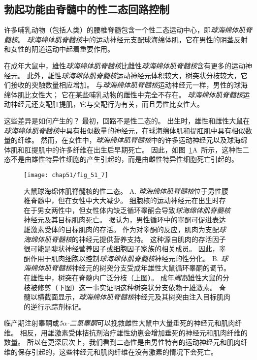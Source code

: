 \subsection{勃起功能由脊髓中的性二态回路控制}

许多哺乳动物（包括人类）的腰椎脊髓包含一个性二态运动中心，即\textit{球海绵体肌脊髓核}。
\textit{球海绵体肌脊髓核}中的运动神经元支配球海绵体肌，它在男性的阴茎反射和女性的阴道运动中起着重要作用。


在成年大鼠中，雄性\textit{球海绵体肌脊髓核}比雌性\textit{球海绵体肌脊髓核}含有更多的运动神经元。
此外，雄性\textit{球海绵体肌脊髓核}运动神经元体积较大，树突状分枝较大，它们接收的突触数量相应增加。
与\textit{球海绵体肌脊髓核}运动神经元一样，男性的球海绵体肌比女性大；
它在某些哺乳动物的雌性中完全不存在。
\textit{球海绵体肌脊髓核}运动神经元还支配肛提肌，它与交配行为有关，而且男性比女性大。


这些差异是如何产生的？
最初，回路不是性二态的。
出生时，雄性和雌性大鼠在\textit{球海绵体肌脊髓核}中具有相似数量的神经元，在球海绵体肌和提肛肌中具有相似数量的纤维。
然而，在女性中，\textit{球海绵体肌脊髓核}中的许多运动神经元以及球海绵体肌和肛提肌中的许多纤维在出生后早期死亡。
因此，如图~\ref{fig:51_7}A~所示，这种性二态不是由雄性特异性细胞的产生引起的，而是由雌性特异性细胞死亡引起的。


\begin{figure}[htbp]
	\centering
	\texttt{[image: chap51/fig\_51\_7]}
	\caption{大鼠球海绵体肌脊髓核的性二态。
		A. \textit{球海绵体肌脊髓核}位于男性腰椎脊髓中，但在女性中大大减少。
		细胞核的运动神经元在出生时存在于男女两性中，但女性体内缺乏循环睾酮会导致\textit{球海绵体肌脊髓核}神经元及其目标肌肉死亡。
		据认为，男性循环中的睾酮可促进表达雄激素受体的目标肌肉的存活。
		作为对睾酮的反应，肌肉为支配\textit{球海绵体肌脊髓核}的神经元提供营养支持。
		这种源自肌肉的存活因子很可能是睫状神经营养因子或细胞因子家族的相关成员。
		因此，睾酮作用于肌肉细胞以控制\textit{球海绵体肌脊髓核}神经元的性分化\cite{morris2004sexual}。
		B. \textit{球海绵体肌脊髓核}神经元的树突分支受成年雄性大鼠循环睾酮的调节。
		在雄性中，树突在脊髓内广泛分枝（上图）。
		成年\textit{阉割}雄性大鼠的分枝被修剪（下图）这一事实证明这种树突状分支依赖于雄激素。
		脊髓以横截面显示，\textit{球海绵体肌脊髓核}神经元及其树突由注入目标肌肉的逆行示踪剂标记\cite{cooke2005gonadal}。}
	\label{fig:51_7}
\end{figure}


临产期注射睾酮或\textit{5$\alpha$-二氢睾酮}可以挽救雌性大鼠中大量垂死的神经元和肌肉纤维。
相反，用雄激素受体拮抗剂治疗雄性幼崽会增加垂死的神经元和肌肉纤维的数量。
所以在更深层次上，我们看到二态性是由男性特有的运动神经元和肌肉纤维的保存引起的，这些神经元和肌肉纤维在没有激素的情况下会死亡。


